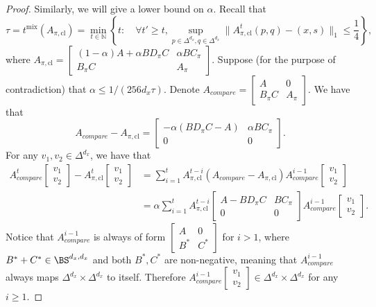\begin{proof}
Similarly, we will give a lower bound on $\alpha$. Recall that 
$$\tau=t^{\mathrm{mix}}(A_{\pi,\mathrm{cl}})=\min_{t\in\mathbb{N}}\left\{t: \quad \forall t'\ge t, \sup_{p\in\Delta^{d_x},q\in\Delta^{d_x}}\|A_{\pi,\mathrm{cl}}^t(p,q)-(x,s)\|_1\le \frac{1}{4}\right\},$$
where $A_{\pi,\mathrm{cl}}=\begin{bmatrix}
(1-\alpha)A+\alpha BD_{\pi}C & \alpha BC_{\pi} \\
 B_{\pi}C & A_{\pi}
\end{bmatrix}$. Suppose (for the purpose of contradiction) that $\alpha\le 1/(256d_x\tau)$. Denote 
$A_{compare}=\begin{bmatrix}
A & 0 \\
 B_{\pi}C & A_{\pi}
\end{bmatrix}$. We have that
$$
A_{compare}-A_{\pi,\mathrm{cl}}=\begin{bmatrix}
-\alpha(BD_{\pi}C -A) & \alpha B C_{\pi} \\
 0 & 0
\end{bmatrix}.
$$
For any $v_1,v_2\in \Delta^{d_x}$, we have that
\begin{align*}
 A_{compare}^t \begin{bmatrix}
v_1 \\
v_2
\end{bmatrix}-   A_{\pi,\mathrm{cl}}^t \begin{bmatrix}
v_1 \\
v_2
\end{bmatrix} &=\sum_{i=1}^t A_{\pi,\mathrm{cl}}^{t-i}(A_{compare}-A_{\pi,\mathrm{cl}}) A_{compare}^{i-1} \begin{bmatrix}
v_1 \\
v_2
\end{bmatrix}\\
&=\alpha\sum_{i=1}^t A_{\pi,\mathrm{cl}}^{t-i} \begin{bmatrix}
A-BD_{\pi}C & B C_{\pi} \\
 0 & 0
\end{bmatrix}A_{compare}^{i-1} \begin{bmatrix}
v_1 \\
v_2
\end{bmatrix}.
\end{align*}
Notice that $A_{compare}^{i-1}$ is always of form $\begin{bmatrix}
A & 0 \\
 B^* & C^*
\end{bmatrix}$ for $i>1$, where $B^*+C^*\in \BS^{d_x,d_x}$ and both $B^*, C^*$ are non-negative, meaning that $A_{compare}^{i-1}$ always maps $\Delta^{d_x} \times \Delta^{d_x}$ to itself. Therefore $A_{compare}^{i-1} \begin{bmatrix}
v_1 \\
v_2
\end{bmatrix}\in \Delta^{d_x} \times \Delta^{d_x}$ for any $i\ge 1$.


\end{proof}
